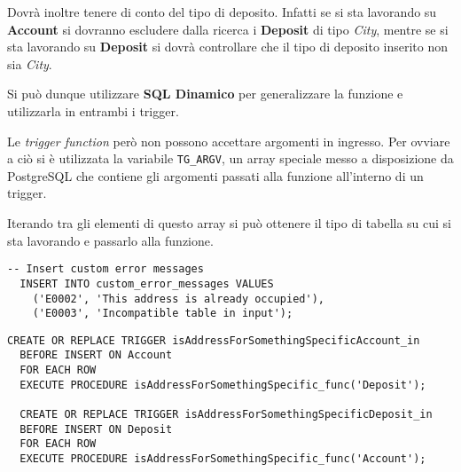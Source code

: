 Dovrà inoltre tenere di conto del tipo di deposito. Infatti se si sta lavorando su \textbf{Account} si dovranno escludere dalla ricerca i \textbf{Deposit} di tipo \textit{City}, mentre se si sta lavorando su \textbf{Deposit} si dovrà controllare che il tipo di deposito inserito non sia \textit{City}.

Si può dunque utilizzare \textbf{SQL Dinamico} per generalizzare la funzione e utilizzarla in entrambi i trigger.

Le \textit{trigger function} però non possono accettare argomenti in ingresso. Per ovviare a ciò si è utilizzata la variabile \lstinline{TG_ARGV}, un array speciale messo a disposizione da PostgreSQL che contiene gli argomenti passati alla funzione all'interno di un trigger.

Iterando tra gli elementi di questo array si può ottenere il tipo di tabella su cui si sta lavorando e passarlo alla funzione.

\begin{lstlisting}[caption={Creazione errori personalizzati per \textbf{isAddressForSomethingSpecific}}]
  -- Insert custom error messages
  INSERT INTO custom_error_messages VALUES 
    ('E0002', 'This address is already occupied'),
    ('E0003', 'Incompatible table in input');
\end{lstlisting}

\begin{lstlisting}[caption={Creazione dei trigger per il vincolo \textbf{isAddressForSomethingSpecific}}]
  CREATE OR REPLACE TRIGGER isAddressForSomethingSpecificAccount_in
  BEFORE INSERT ON Account
  FOR EACH ROW
  EXECUTE PROCEDURE isAddressForSomethingSpecific_func('Deposit');

  CREATE OR REPLACE TRIGGER isAddressForSomethingSpecificDeposit_in
  BEFORE INSERT ON Deposit
  FOR EACH ROW
  EXECUTE PROCEDURE isAddressForSomethingSpecific_func('Account');
\end{lstlisting}

